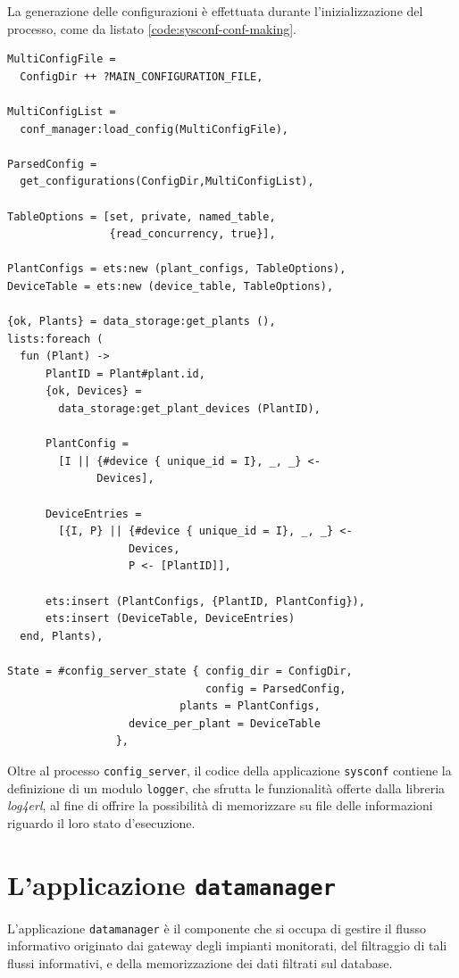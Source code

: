 %
La generazione delle configurazioni \`e effettuata durante l'inizializzazione del processo, 
come da listato \ref{code:sysconf-conf-making}.
%
\begin{lstlisting}[caption={Costruzione delle tabelle \texttt{plant} e \texttt{device\_per\_plant}}, label={code:sysconf-conf-making},frame=trBL]
MultiConfigFile = 
  ConfigDir ++ ?MAIN_CONFIGURATION_FILE,

MultiConfigList = 
  conf_manager:load_config(MultiConfigFile),

ParsedConfig = 
  get_configurations(ConfigDir,MultiConfigList),

TableOptions = [set, private, named_table, 
                {read_concurrency, true}],

PlantConfigs = ets:new (plant_configs, TableOptions),
DeviceTable = ets:new (device_table, TableOptions),
    
{ok, Plants} = data_storage:get_plants (),
lists:foreach (
  fun (Plant) ->
      PlantID = Plant#plant.id,
      {ok, Devices} = 
        data_storage:get_plant_devices (PlantID),

      PlantConfig = 
        [I || {#device { unique_id = I}, _, _} <- 
              Devices],

      DeviceEntries = 
        [{I, P} || {#device { unique_id = I}, _, _} <-
                   Devices,
                   P <- [PlantID]],
	      
      ets:insert (PlantConfigs, {PlantID, PlantConfig}),
      ets:insert (DeviceTable, DeviceEntries)
  end, Plants),

State = #config_server_state { config_dir = ConfigDir,
                               config = ParsedConfig,
     		               plants = PlantConfigs,
			       device_per_plant = DeviceTable
			     },
\end{lstlisting}
%

%
Oltre al processo \texttt{config\_server}, il codice della applicazione \texttt{sysconf}
contiene la definizione di un modulo \texttt{logger}, che sfrutta le funzionalit\`a
offerte dalla libreria \emph{log4erl}\cite{log4erl}, al fine di offrire la possibilit\`a 
di memorizzare su file delle informazioni riguardo il loro stato d'esecuzione.
%

%
\section{L'applicazione \texttt{datamanager}}
%
L'applicazione \texttt{datamanager} \`e il componente che si occupa di gestire il flusso 
informativo originato dai gateway degli impianti monitorati, del filtraggio di tali 
flussi informativi, e della memorizzazione dei dati filtrati sul database.
%

